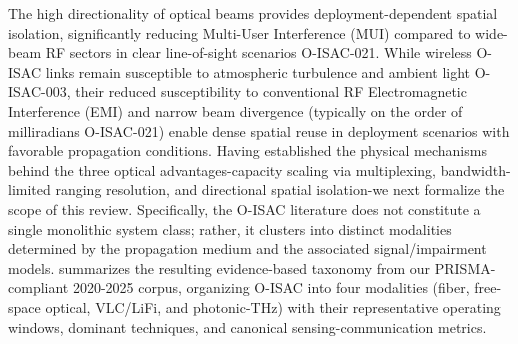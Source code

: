 \markdownRendererUlEndTight \markdownRendererInterblockSeparator
{}
\markdownRendererSectionEnd \markdownRendererSectionBegin
{}\markdownRendererInterblockSeparator
{}The high directionality of optical beams provides deployment-dependent spatial isolation, significantly reducing Multi-User Interference (MUI) compared to wide-beam RF sectors in clear line-of-sight scenarios O-ISAC-021. While wireless O-ISAC links remain susceptible to atmospheric turbulence and ambient light O-ISAC-003, their reduced susceptibility to conventional RF Electromagnetic Interference (EMI) and narrow beam divergence (typically on the order of milliradians O-ISAC-021) enable dense spatial reuse in deployment scenarios with favorable propagation conditions.\markdownRendererInterblockSeparator
{}
\markdownRendererSectionEnd 
\markdownRendererSectionEnd \markdownRendererSectionBegin
{}\markdownRendererInterblockSeparator
{}Having established the physical mechanisms behind the three optical advantages-capacity scaling via multiplexing, bandwidth-limited ranging resolution, and directional spatial isolation-we next formalize the scope of this review. Specifically, the O-ISAC literature does not constitute a single monolithic system class; rather, it clusters into distinct modalities determined by the propagation medium and the associated signal/impairment models.  summarizes the resulting evidence-based taxonomy from our PRISMA-compliant 2020-2025 corpus, organizing O-ISAC into four modalities (fiber, free-space optical, VLC/LiFi, and photonic-THz) with their representative operating windows, dominant techniques, and canonical sensing-communication metrics.\markdownRendererParagraphSeparator
{}\markdownRendererInterblockSeparator

